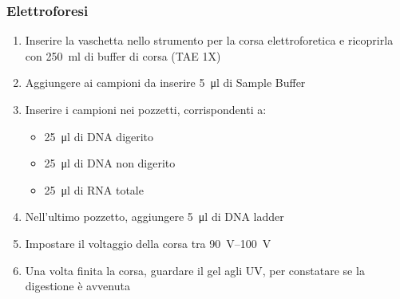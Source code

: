\subsubsection{Elettroforesi}
\begin{enumerate}
	\item Inserire la vaschetta nello strumento per la corsa elettroforetica e ricoprirla con \qty{250}{\ml} di buffer di corsa (TAE 1X) 
	\item Aggiungere ai campioni da inserire \qty{5}{\micro\litre} di \foreignlanguage{english}{Sample Buffer}
	\item Inserire i campioni nei pozzetti, corrispondenti a:
	\begin{itemize}
		\item \qty{25}{\micro\litre} di DNA digerito
		\item \qty{25}{\micro\litre} di DNA non digerito
		\item \qty{25}{\micro\litre} di RNA totale
	\end{itemize}
	\item Nell'ultimo pozzetto, aggiungere \qty{5}{\micro\litre} di DNA \foreignlanguage{english}{ladder}
	\item Impostare il voltaggio della corsa tra \qtyrange{90}{100}{\volt}
	\item Una volta finita la corsa, guardare il gel agli UV, per constatare se la digestione è avvenuta
\end{enumerate}

\begingroup
	\newpage

	\vspace{.15cm}

